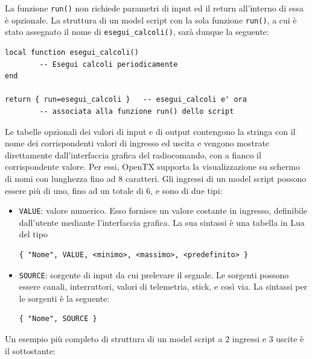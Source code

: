 \documentclass[a4paper, 12pt]{report} %
\begin{document}
La funzione \texttt{run()} non richiede parametri di input ed il return all'interno di essa è opzionale. La struttura di un model script con la sola funzione \texttt{run()}, a cui è stato assegnato il nome di \texttt{esegui\_calcoli()}, sarà dunque la seguente:

\begin{lstlisting}
local function esegui_calcoli()
        -- Esegui calcoli periodicamente
end

return { run=esegui_calcoli }   -- esegui_calcoli e' ora
        -- associata alla funzione run() dello script
\end{lstlisting}

Le tabelle opzionali dei valori di input e di output contengono la stringa con il nome dei corrispondenti valori di ingresso ed uscita e vengono mostrate direttamente dall'interfaccia grafica del radiocomando, con a fianco il corrispondente valore. Per essi, OpenTX supporta la visualizzazione su schermo di nomi con lunghezza fino ad $8$ caratteri. Gli ingressi di un model script possono essere più di uno, fino ad un totale di $6$, e sono di due tipi:
\begin{itemize}
        \item \texttt{VALUE}: valore numerico. Esso fornisce un valore costante in ingresso, definibile dall'utente mediante l'interfaccia grafica. La sua sintassi è una tabella in Lua del tipo 
\begin{lstlisting}
{ "Nome", VALUE, <minimo>, <massimo>, <predefinito> }
\end{lstlisting}
        \item \texttt{SOURCE}: sorgente di input da cui prelevare il segnale. Le sorgenti possono essere canali, interruttori, valori di telemetria, stick, e così via. La sintassi per le sorgenti è la seguente:
\begin{lstlisting}
{ "Nome", SOURCE }
\end{lstlisting}
\end{itemize}

Un esempio più completo di struttura di un model script a $2$ ingressi e $3$ uscite è il sottostante:
\end{document}
